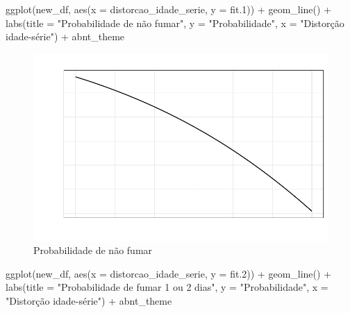 \documentclass[
]{article}
\newenvironment{Shaded}{\begin{snugshade}}{\end{snugshade}}
\newcommand{\AttributeTok}[1]{\textcolor[rgb]{0.40,0.45,0.13}{#1}}
\newcommand{\FloatTok}[1]{\textcolor[rgb]{0.68,0.00,0.00}{#1}}
\newcommand{\FunctionTok}[1]{\textcolor[rgb]{0.28,0.35,0.67}{#1}}
\newcommand{\NormalTok}[1]{\textcolor[rgb]{0.00,0.23,0.31}{#1}}
\newcommand{\SpecialCharTok}[1]{\textcolor[rgb]{0.37,0.37,0.37}{#1}}
\newcommand{\StringTok}[1]{\textcolor[rgb]{0.13,0.47,0.30}{#1}}
\begin{document}
\begin{Shaded}
\begin{Highlighting}[]
\FunctionTok{ggplot}\NormalTok{(new\_df, }\FunctionTok{aes}\NormalTok{(}\AttributeTok{x =}\NormalTok{ distorcao\_idade\_serie, }\AttributeTok{y =}\NormalTok{ fit}\FloatTok{.1}\NormalTok{)) }\SpecialCharTok{+} \FunctionTok{geom\_line}\NormalTok{() }\SpecialCharTok{+} \FunctionTok{labs}\NormalTok{(}\AttributeTok{title =} \StringTok{"Probabilidade de não fumar"}\NormalTok{, }\AttributeTok{y =} \StringTok{"Probabilidade"}\NormalTok{, }\AttributeTok{x =} \StringTok{"Distorção idade{-}série"}\NormalTok{) }\SpecialCharTok{+}\NormalTok{ abnt\_theme}
\end{Highlighting}
\end{Shaded}

\begin{figure}[H]

{\centering \includegraphics{main_files/figure-pdf/fig-line-plot-1.pdf}

}

\caption{\label{fig-line-plot}Probabilidade de não fumar}

\end{figure}

\begin{Shaded}
\begin{Highlighting}[]
\FunctionTok{ggplot}\NormalTok{(new\_df, }\FunctionTok{aes}\NormalTok{(}\AttributeTok{x =}\NormalTok{ distorcao\_idade\_serie, }\AttributeTok{y =}\NormalTok{ fit}\FloatTok{.2}\NormalTok{)) }\SpecialCharTok{+} \FunctionTok{geom\_line}\NormalTok{() }\SpecialCharTok{+} \FunctionTok{labs}\NormalTok{(}\AttributeTok{title =} \StringTok{"Probabilidade de fumar 1 ou 2 dias"}\NormalTok{, }\AttributeTok{y =} \StringTok{"Probabilidade"}\NormalTok{, }\AttributeTok{x =} \StringTok{"Distorção idade{-}série"}\NormalTok{) }\SpecialCharTok{+}\NormalTok{ abnt\_theme}
\end{Highlighting}
\end{Shaded}
\end{document}
